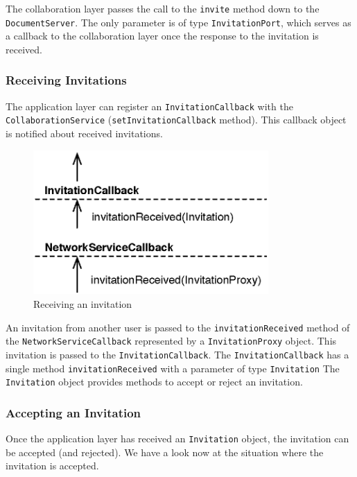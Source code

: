 The collaboration layer passes the call to the \texttt{invite} method down
to the \texttt{DocumentServer}. The only parameter is of type 
\texttt{InvitationPort}, which serves as a callback to the collaboration layer
once the response to the invitation is received.

\subsubsection{Receiving Invitations}
The application layer can register an \texttt{InvitationCallback} with
the \texttt{CollaborationService} (\texttt{setInvitationCallback} method).
This callback object is notified about received invitations.

\begin{figure}[H]
 \centering
 \includegraphics[width=8.96cm,height=5.50cm]{../images/finalreport/architecture_flows/invite_receive.eps}
 \caption{Receiving an invitation}
 \label{fig:archoverview.flow.invitereceive}
\end{figure}

An invitation from another user is passed to the \texttt{invitationReceived}
method of the \texttt{NetworkServiceCallback} represented by a
\texttt{InvitationProxy} object. This invitation is passed to the
\texttt{InvitationCallback}. The \texttt{InvitationCallback} has a single method 
\texttt{invitation\-Received} with a parameter of type \texttt{Invitation}
The \texttt{Invitation} object provides methods to accept or reject
an invitation.

\subsubsection{Accepting an Invitation}
Once the application layer has received an \texttt{Invitation} object, the
invitation can be accepted (and rejected). We have a look now at the situation
where the invitation is accepted.

